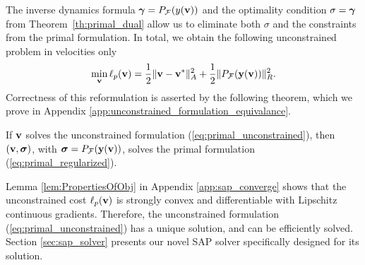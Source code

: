 The inverse dynamics formula ${\bm\gamma} = P_{\mathcal{F}}(y({\mathbf{v}}))$  and the optimality
condition $\sigma = {\bm\gamma}$ from Theorem~\ref{th:primal_dual}
allow us to eliminate both $\sigma$ and the constraints from the primal
formulation. In total, we obtain the following unconstrained problem
in velocities only
\begin{eqnarray}
	\min_{\mf{v}} \ell_p(\mf{v}) = \frac{1}{2}\Vert\mf{v}-\mf{v}^*\Vert_{A}^2 +
	\frac{1}{2}\Vert P_\mathcal{F}(\mf{y}(\mf{v}))\Vert_R^2.
	\label{eq:primal_unconstrained}
\end{eqnarray}
Correctness of this reformulation is asserted by the following theorem, 
which we prove in Appendix \ref{app:unconstrained_formulation_equivalance}.
\begin{theorem}
  If  ${\mathbf{v}}$ solves the unconstrained formulation (\ref{eq:primal_unconstrained}),
    then $({\mathbf{v}}, {\bm\sigma})$,
    with ${\bm\sigma} =P_\mathcal{F}({\mathbf{y}}({\mathbf{v}}))$,
    solves the primal
    formulation (\ref{eq:primal_regularized}).
    \label{th:unconstrained_formulation_equivalance}
\end{theorem}
Lemma \ref{lem:PropertiesOfObj} in Appendix \ref{app:sap_converge}
shows that the unconstrained cost $\ell_p({\mathbf{v}})$ is strongly convex and
differentiable with Lipschitz continuous gradients. Therefore, the unconstrained
formulation (\ref{eq:primal_unconstrained}) has a unique solution, and can be
efficiently solved.  
Section \ref{sec:sap_solver} presents our novel SAP solver specifically designed
for its solution.
